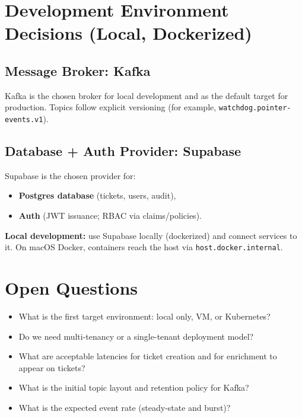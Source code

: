 \documentclass[11pt]{article}
\begin{document}
\section{Development Environment Decisions (Local, Dockerized)}
\subsection{Message Broker: Kafka}
Kafka is the chosen broker for local development and as the default target for production.
Topics follow explicit versioning (for example, \texttt{watchdog.pointer-events.v1}).

\subsection{Database + Auth Provider: Supabase}
Supabase is the chosen provider for:
\begin{itemize}
  \item \textbf{Postgres database} (tickets, users, audit),
  \item \textbf{Auth} (JWT issuance; RBAC via claims/policies).
\end{itemize}

\textbf{Local development:} use Supabase locally (dockerized) and connect services to it.
On macOS Docker, containers reach the host via \texttt{host.docker.internal}.

\section{Open Questions}
\begin{itemize}
  \item What is the first target environment: local only, VM, or Kubernetes?
  \item Do we need multi-tenancy or a single-tenant deployment model?
  \item What are acceptable latencies for ticket creation and for enrichment to appear on tickets?
  \item What is the initial topic layout and retention policy for Kafka?
  \item What is the expected event rate (steady-state and burst)?
\end{itemize}
\end{document}

